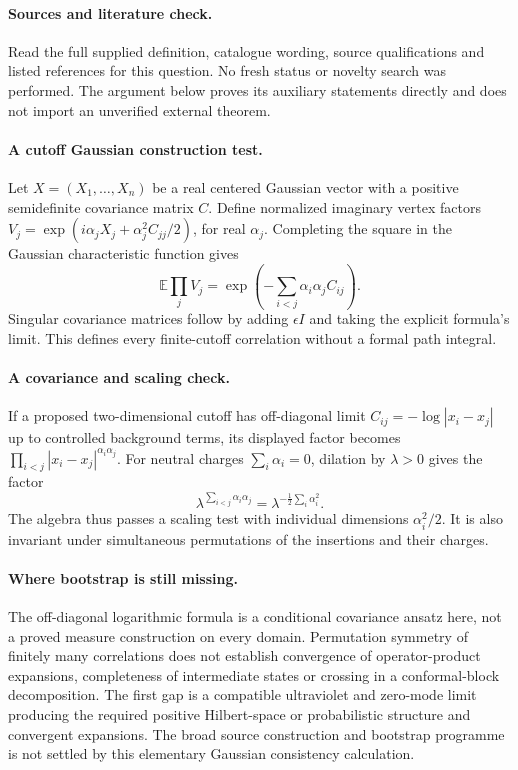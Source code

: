 \documentclass[11pt]{article}
\begin{document}
\paragraph{Sources and literature check.}
Read the full supplied definition, catalogue wording, source qualifications and listed references for this question. No fresh status or novelty search was performed. The argument below proves its auxiliary statements directly and does not import an unverified external theorem.

\paragraph{A cutoff Gaussian construction test.} Let \(X=(X_1,\ldots,X_n)\) be a real centered Gaussian vector with a positive semidefinite covariance matrix \(C\). Define normalized imaginary vertex factors \(V_j=\exp(i\alpha_jX_j+\alpha_j^2 C_{jj}/2)\), for real \(\alpha_j\). Completing the square in the Gaussian characteristic function gives
\[
 \mathbb E\prod_jV_j
 =\exp\left(-\sum_{i<j}\alpha_i\alpha_j C_{ij}\right).
\]
Singular covariance matrices follow by adding \(\epsilon I\) and taking the explicit formula's limit. This defines every finite-cutoff correlation without a formal path integral.
\paragraph{A covariance and scaling check.} If a proposed two-dimensional cutoff has off-diagonal limit \(C_{ij}=-\log|x_i-x_j|\) up to controlled background terms, its displayed factor becomes \(\prod_{i<j}|x_i-x_j|^{\alpha_i\alpha_j}\). For neutral charges \(\sum_i\alpha_i=0\), dilation by \(\lambda>0\) gives the factor
\[
 \lambda^{\sum_{i<j}\alpha_i\alpha_j}
 =\lambda^{-\frac12\sum_i\alpha_i^2}.
\]
The algebra thus passes a scaling test with individual dimensions \(\alpha_i^2/2\). It is also invariant under simultaneous permutations of the insertions and their charges.
\paragraph{Where bootstrap is still missing.} The off-diagonal logarithmic formula is a conditional covariance ansatz here, not a proved measure construction on every domain. Permutation symmetry of finitely many correlations does not establish convergence of operator-product expansions, completeness of intermediate states or crossing in a conformal-block decomposition. The first gap is a compatible ultraviolet and zero-mode limit producing the required positive Hilbert-space or probabilistic structure and convergent expansions. The broad source construction and bootstrap programme is not settled by this elementary Gaussian consistency calculation.
\end{document}
